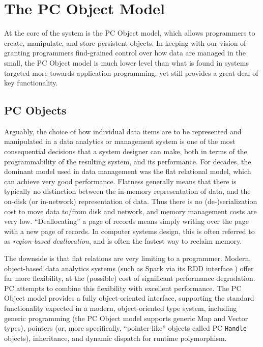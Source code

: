 \section{The PC Object Model} \label{sec:ObjectModel}

At the core of the system is the PC Object model, which allows 
programmers to create, manipulate, and store persistent objects.
In-keeping with our vision of granting programmers find-grained control over how data are managed in the small, the PC Object model
is much lower level than what is found in systems targeted more towards application programming, yet still provides a great deal of
key functionality.

\subsection{PC Objects}

Arguably, the choice of how individual data items are to be represented and manipulated
in a data analytics or management system is one of the most consequential decisions
that a system designer can make, both in terms of 
the programmability of the resulting system, and its performance.  For decades, the dominant model used in
data management was the flat relational model, which 
can achieve very good performance.
Flatness generally means 
that there is typically no distinction between the in-memory representation of data, and the on-disk (or in-network) representation of
data. Thus there is no (de-)serialization cost to move data to/from disk and network, and memory management costs are very low. ``Deallocating'' a page of records
means simply writing over the page with a new page of records.  In computer systems design, this is often referred to as \emph{region-based deallocation}, and is often
the fastest way to reclaim memory.

The downside is that flat relations are very limiting to a programmer.  Modern, object-based 
data analytics systems 
(such as Spark via its RDD interface \cite{}) offer far more flexibility, at the (possible) cost of significant performance degradation.  
PC attempts to combine this flexibility with excellent performance.
The PC Object model provides a fully object-oriented interface, supporting the standard functionality expected in a modern, object-oriented type system,
including generic programming (the PC Object model supports generic Map and Vector types), pointers (or, more specifically,
``pointer-like'' objects called PC \texttt{Handle} objects), inheritance, and dynamic dispatch for runtime polymorphism.  

